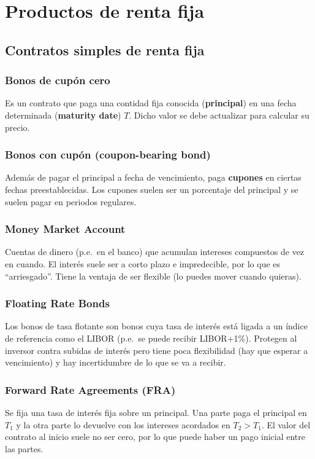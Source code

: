 \section{Productos de renta fija}



\subsection{Contratos simples de renta fija}

\subsubsection{Bonos de cupón cero}
Es un contrato que paga una contidad fija conocida (\textbf{principal}) en una fecha determinada (\textbf{maturity date}) $T$. Dicho valor se debe actualizar para calcular su precio.



\subsubsection{Bonos con cupón (coupon-bearing bond)}
Además de pagar el principal a fecha de vencimiento, paga \textbf{cupones} en ciertas fechas preestablecidas. Los cupones suelen ser un porcentaje del principal y se suelen pagar en periodos regulares.



\subsubsection{Money Market Account}
Cuentas de dinero (p.e.\ en el banco) que acumulan intereses compuestos de vez en cuando. El interés suele ser a corto plazo e impredecible, por lo que es ``arriesgado''. Tiene la ventaja de ser flexible (lo puedes mover cuando quieras).



\subsubsection{Floating Rate Bonds}
Los bonos de tasa flotante son bonos cuya tasa de interés está ligada a un índice de referencia  como el LIBOR (p.e.\ se puede recibir LIBOR+1\%). Protegen al inversor contra subidas de interés pero tiene poca flexibilidad (hay que esperar a vencimiento) y hay incertidumbre de lo que se va a recibir.



\subsubsection{Forward Rate Agreements (FRA)}
Se fija una tasa de interés fija sobre un principal. Una parte paga el principal en $T_1$ y la otra parte lo devuelve con los intereses acordados en $T_2 > T_1$. El valor del contrato al inicio suele no ser cero, por lo que puede haber un pago inicial entre las partes.



